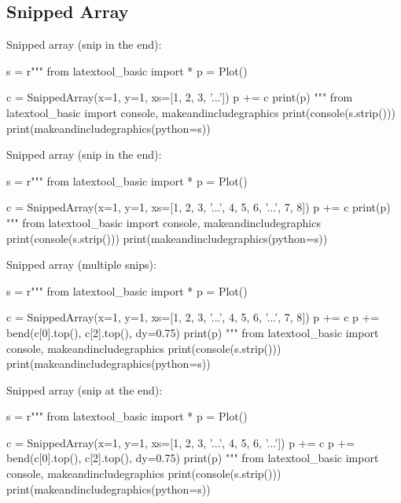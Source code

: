 \subsection{Snipped Array}


\begin{samepage}
Snipped array (snip in the end):
\begin{python}
s = r"""
from latextool_basic import *
p = Plot()

c = SnippedArray(x=1, y=1, xs=[1, 2, 3, '...'])
p += c
print(p)
"""
from latextool_basic import console, makeandincludegraphics
print(console(s.strip()))
print(makeandincludegraphics(python=s))
\end{python}
\end{samepage}



\begin{samepage}
Snipped array (snip in the end):
\begin{python}
s = r"""
from latextool_basic import *
p = Plot()

c = SnippedArray(x=1, y=1, xs=[1, 2, 3, '...', 4, 5, 6, '...', 7, 8])
p += c
print(p)
"""
from latextool_basic import console, makeandincludegraphics
print(console(s.strip()))
print(makeandincludegraphics(python=s))
\end{python}
\end{samepage}





\begin{samepage}
Snipped array (multiple snips):
\begin{python}
s = r"""
from latextool_basic import *
p = Plot()

c = SnippedArray(x=1, y=1, xs=[1, 2, 3, '...', 4, 5, 6, '...', 7, 8])
p += c
p += bend(c[0].top(), c[2].top(), dy=0.75)
print(p)
"""
from latextool_basic import console, makeandincludegraphics
print(console(s.strip()))
print(makeandincludegraphics(python=s))
\end{python}
\end{samepage}



\begin{samepage}
Snipped array (snip at the end):
\begin{python}
s = r"""
from latextool_basic import *
p = Plot()

c = SnippedArray(x=1, y=1, xs=[1, 2, 3, '...', 4, 5, 6, '...'])
p += c
p += bend(c[0].top(), c[2].top(), dy=0.75)
print(p)
"""
from latextool_basic import console, makeandincludegraphics
print(console(s.strip()))
print(makeandincludegraphics(python=s))
\end{python}
\end{samepage}


